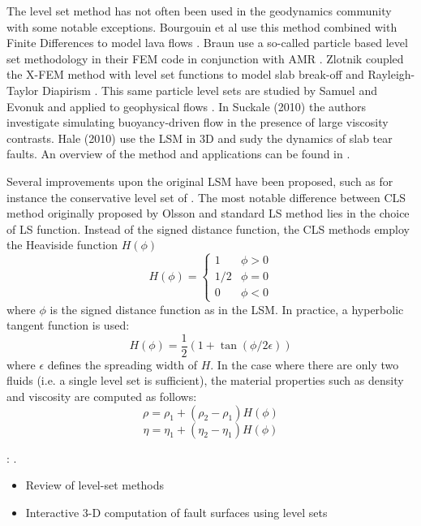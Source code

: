 The level set method has not often been used in the geodynamics 
community with some notable exceptions.
Bourgouin et al use this method combined with Finite Differences to model 
lava flows \cite{bomh06,bomh07,habm07,grbh07}.
Braun \etal use a so-called particle based level set methodology in their 
FEM code in conjunction with AMR \cite{brtf08}.
Zlotnik \etal coupled the X-FEM method with level set functions to model 
slab break-off and Rayleigh-Taylor Diapirism \cite{zlfd08}.
This same particle level sets are studied by Samuel and Evonuk and applied to geophysical flows \cite{saev10}. 
In Suckale \etal (2010) \cite{sunh10,suhe10} the authors investigate simulating buoyancy-driven flow in the presence of large viscosity contrasts.
Hale \etal (2010) \cite{hagr10} use the LSM in 3D and sudy the dynamics of slab tear faults.
An overview of the method and applications can
be found in \cite{osfe01}.

Several improvements upon the original LSM have been proposed, 
such as for instance the conservative level set of \cite{zhbl14}.
The most notable difference between CLS method originally proposed by Olsson \etal \cite{olkr05,olkz07}
and standard LS method lies in the choice of LS function. Instead of the signed distance function, the
CLS methods employ the Heaviside function $H(\phi)$ 
\[
H(\phi)=
\left\{
\begin{array}{ll}
1 & \phi>0 \\
1/2 & \phi=0 \\
0 & \phi<0
\end{array}
\right.
\]
where $\phi$ is the signed distance function as in the LSM. 
In practice, a hyperbolic tangent function is used:
\[
H(\phi) = \frac{1}{2} (1+\tan (\phi/2\epsilon))
\]
where $\epsilon$ defines the spreading width of $H$. In the case where there are only 
two fluids (i.e. a single level set is sufficient), the material properties such as density and viscosity
are computed as follows:
\[
\rho=\rho_1+(\rho_2-\rho_1)H(\phi)
\]
\[
\eta=\eta_1+(\eta_2-\eta_1)H(\phi)
\]

\Literature: \cite{vasv05,vasv08,migi07,vasv05b}. 
\begin{itemize}
\item Review of level-set methods \cite{gifo18}
\item Interactive 3-D computation of fault surfaces using level sets \cite{kadt08}
\end{itemize}





